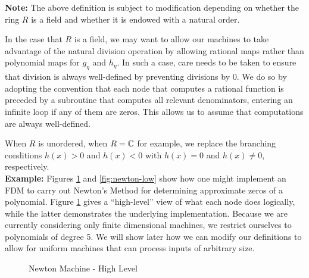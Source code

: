 \textbf{Note: }The above definition is subject to modification
depending on whether the ring $R$ is a field and whether it is endowed
with a natural order.

In the case that $R$ is a field, we may want to allow our machines to
take advantage of the natural division operation by allowing rational
maps rather than polynomial maps for $g_\eta$ and $h_\eta$.  In such a
case, care needs to be taken to ensure that division is always
well-defined by preventing divisions by $0$.  We do so by adopting the
convention that each node that computes a rational function is
preceded by a subroutine that computes all relevant denominators,
entering an infinite loop if any of them are zeros.  This allows us to
assume that computations are always well-defined.

When $R$ is unordered, when $R = \mathbb{C}$ for example, we replace
the branching conditions $h(x) > 0$ and $h(x) < 0$ with $h(x) = 0$ and
$h(x) \neq 0$, respectively.\\

\textbf{Example: } Figures \ref{fig:newton-high} and
\ref{fig:newton-low} show how one might implement an FDM to carry out
Newton's Method for determining approximate zeros of a polynomial.
Figure \ref{fig:newton-high} gives a ``high-level'' view of what each
node does logically, while the latter demonstrates the underlying
implementation.  Because we are currently considering only finite
dimensional machines, we restrict ourselves to polynomials of degree
5.  We will show later how we can modify our definitions to allow for
uniform machines that can process inputs of arbitrary size.

\begin{figure}[p]
  \centering


  \caption{Newton Machine - High Level}
  \label{fig:newton-high}
\end{figure}

